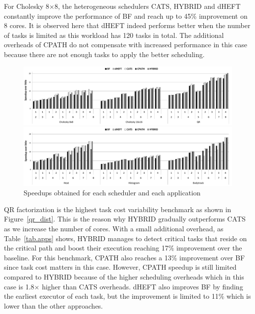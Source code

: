 For Cholesky 8$\times$8, the heterogeneous schedulers CATS, HYBRID and dHEFT constantly improve the performance of BF and reach up to 45\% improvement on 8 cores.
It is observed here that dHEFT indeed performs better when the number of tasks is limited as this workload has 120 tasks in total.
The additional overheads of CPATH do not compensate with increased performance in this case because there are not enough tasks to apply the better scheduling.
\begin{figure}[!t]
  \includegraphics[width=\textwidth]{images/speedup_apps1.pdf}
   \vspace{-0.4cm}

  \includegraphics[width=\textwidth]{images/speedup_apps2.pdf}
  \caption{Speedups obtained for each scheduler and each application}
  \label{speedup}
  \vspace{-0.4cm}
\end{figure}  

QR factorization is the highest task cost variability benchmark as shown in Figure~\ref{qr_dist}.
This is the reason why HYBRID gradually outperforms CATS as we increase the number of cores.
With a small additional overhead,
as Table~\ref{tab.apps} shows, HYBRID manages to detect critical tasks that reside on the critical path and boost their execution reaching 17\% improvement over the baseline.
For this benchmark, CPATH also reaches a 13\% improvement over BF since task cost matters in this case. 
However, CPATH speedup is still limited compared to HYBRID because of the higher scheduling overheads which in this case is 1.8$\times$ higher than CATS overheads.
dHEFT also improves BF by finding the earliest executor of each task, but the improvement is limited to 11\% which is lower than the other approaches.


